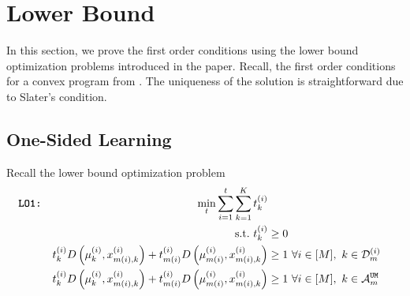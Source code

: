 \documentclass{article}
\newcommand{\UMA}{\mathcal{A}^{\texttt{UM}}}
\begin{document}
\begin{figure}[H]
\begin{minipage}[t]{0.6\textwidth}
\begin{minipage}[t]{\textwidth}
{
            }
        \end{minipage}
    \end{minipage}
    \hfill
    \begin{minipage}[t]{0.38\textwidth}
     {\setcounter{algocf}{3}
        \begin{algorithm}[H]
        \small
        \caption*{}
        \end{algorithm}}
    \end{minipage}
\end{figure}
\section{Lower Bound}
\label{app:firstorder}
In this section, we prove the first order conditions using the lower bound optimization problems introduced in the paper. Recall, the first order conditions for a convex program from \cite{bandyopadhyay2024optimal}. The uniqueness of the solution is straightforward due to Slater's condition.
\subsection{One-Sided Learning}
Recall the lower bound optimization problem 
   \begin{align*}
  \texttt{\textbf{LO1}:}\quad\quad \quad\quad \quad\quad \quad\quad \quad\quad \quad\quad \quad\quad \min_{t} \sum_{i=1}^t\sum_{k=1}^K t_k^{(i)}\\
    \text{s.t.}\ t^{(i)}_k&\geq 0\\
t^{(i)}_{k}D\left(\mu^{(i)}_{k},x^{(i)}_{m(i),k}\right)+t^{(i)}_{m(i)}D\left(\mu^{(i)}_{m(i)},x^{(i)}_{m(i),k}\right)&\geq 1 \ \forall i\in[M],\ k\in \mathcal{D}_m^{(i)}\\
t^{(i)}_{k}D\left(\mu^{(i)}_{k},x^{(i)}_{m(i),k}\right)+t^{(i)}_{m(i)}D\left(\mu^{(i)}_{m(i)},x^{(i)}_{m(i),k}\right)&\geq 1 \ \forall i\in [M],\ k\in\UMA_m
\end{align*}
\end{document}
